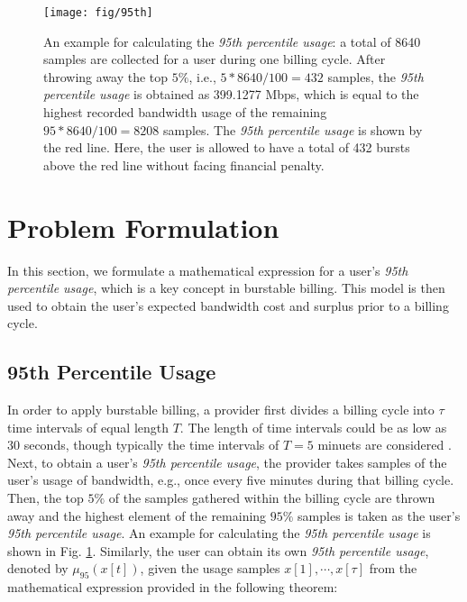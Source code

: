 \documentclass[10pt,journal,compsoc]{IEEEtran}
\begin{document}
 \begin{figure}[!t]
	\centering
	\texttt{[image: fig/95th]}
	\caption{An example for calculating the \emph{95th percentile usage}:
a total of 8640 samples are collected for a user during one billing cycle. After throwing away the top
$5 \%$, i.e.,  $5* 8640 / 100 = 432$ samples, the \emph{95th percentile usage}
is obtained as 399.1277 Mbps, which is equal to the highest recorded bandwidth usage  of the remaining $95 *8640 / 100 = 8208$ samples.
The \emph{95th percentile usage} is shown by the red line.
Here, the user is allowed to have a
total of 432 bursts above the red line without facing financial penalty.}\label{fig:95th}
\end{figure}
\section{Problem Formulation}
In this section, we formulate a mathematical expression for a  user's \emph{95th percentile usage}, which is a key concept in burstable billing. This model is then used to obtain the user's expected bandwidth cost and surplus prior to a billing cycle.

\subsection{95th Percentile Usage}\label{subsec:95thpercentileusage}
In order to apply burstable billing, a provider first divides a
billing cycle into $\tau$  time intervals of equal length $T$. The
length of time intervals could be as low as 30 seconds,
though typically the time intervals of $T = 5$ minuets are
considered \cite{Dimitropoulos2009}. Next, to obtain a user's \emph{95th percentile usage}, the provider takes
 samples of the user's usage of bandwidth, e.g., once every five minutes during  that billing cycle. Then, the top $5\%$ of the samples gathered within the billing cycle are thrown away and  the highest element of the remaining $95\%$ samples is taken as the user's \emph{95th percentile usage}. An example for calculating the \emph{95th percentile usage} is shown in Fig. \ref{fig:95th}. Similarly, the user can obtain its own \emph{95th percentile usage}, denoted by $\mu_{95}(x[t])$, given the usage samples $x[1], \cdots, x[\tau]$ from the mathematical expression provided in the following theorem:  

\vspace{0.1cm}
\end{document}
